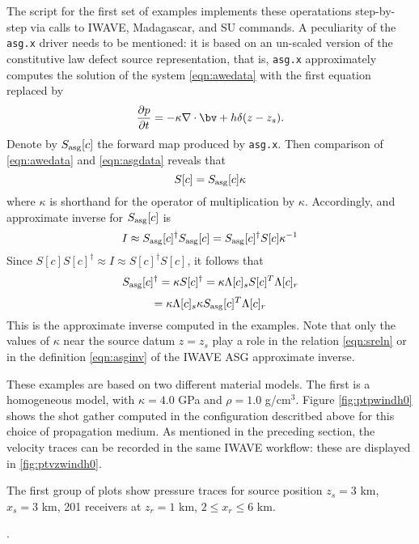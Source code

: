 The script for the first set of examples implements these operatations step-by-step via calls to IWAVE, Madagascar, and SU commands. A peculiarity of the {\tt asg.x} driver needs to be mentioned: it is based on an un-scaled version of the constitutive law defect source representation, that is, {\tt asg.x} approximately computes the solution of the system \ref{eqn:awedata} with the first equation replaced by
\begin{equation}
\label{eqn:asgdata}
\frac{\partial p}{\partial t}  =  - \kappa \nabla \cdot \bv +
h \delta(z-z_s).
\end{equation}
Denote by $S_{\rm asg}[c]$ the forward map produced by {\tt asg.x}. Then comparison of \ref{eqn:awedata} and \ref{eqn:asgdata} reveals that
\begin{equation}
\label{eqn:sreln}
S[c]=S_{\rm asg}[c]\kappa
\end{equation}
where $\kappa$ is shorthand for the operator of multiplication by $\kappa$. Accordingly, and approximate inverse for $S_{\rm asg}[c]$ is
\[
I \approx S_{\rm asg}[c]^{\dagger}S_{\rm asg}[c] = S_{\rm asg}[c]^{\dagger}S[c]\kappa^{-1}
\]
Since $S[c]S[c]^{\dagger} \approx I \approx S[c]^{\dagger}S[c]$, it follows that
\[
S_{\rm asg}[c]^{\dagger}=\kappa S[c]^{\dagger} = \kappa\Lambda[c]_s S[c]^T \Lambda[c]_r 
\]
\begin{equation}
\label{eqn:asginv}
= \kappa \Lambda[c]_s \kappa S_{\rm asg}[c]^T\Lambda[c]_r
\end{equation}
This is the approximate inverse computed in the examples. Note that only the values of $\kappa$ near the source datum $z=z_s$ play a role in the relation \ref{eqn:sreln} or in the definition \ref{eqn:asginv} of the IWAVE ASG approximate inverse.

These examples are based on two different material models. The first is a homogeneous model, with $\kappa=4.0$ GPa and $\rho=1.0$ g/cm$^{3}$. Figure \ref{fig:ptpwindh0} shows the shot gather computed in the configuration descritbed above for this choice of propagation medium. As mentioned in the preceding section, the velocity traces can be recorded in the same IWAVE workflow: these are displayed in 
\ref{fig:ptvzwindh0}. 

The first group of plots show pressure traces for source position $z_s=3$ km, $x_s=3$ km, 201 receivers at $z_r=1$ km, $2 \le x_r \le 6$ km. 

.

